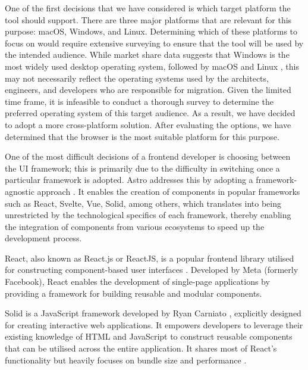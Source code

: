 One of the first decisions that we have considered is which target platform the
tool should support. There are three major platforms that are relevant for this
purpose: macOS, Windows, and Linux. Determining which of these platforms to
focus on would require extensive surveying to ensure that the tool will be used
by the intended audience. While market share data suggests that Windows is the
most widely used desktop operating system, followed by macOS and Linux
, this may not necessarily reflect the
operating systems used by the architects, engineers, and developers who are
responsible for migration. Given the limited time frame, it is infeasible to
conduct a thorough survey to determine the preferred operating system of this
target audience. As a result, we have decided to adopt a more cross-platform
solution. After evaluating the options, we have determined that the browser is
the most suitable platform for this purpose.

One of the most difficult decisions of a frontend developer is choosing between
the UI framework; this is primarily due to the difficulty in switching once a
particular framework is adopted. Astro addresses this by adopting a
framework-agnostic approach . It enables the creation of components
in popular frameworks such as React, Svelte, Vue, Solid, among others, which
translates into being unrestricted by the technological specifics of each
framework, thereby enabling the integration of components from various
ecosystems to speed up the development process.

React, also known as React.js or ReactJS, is a popular frontend library
utilised for constructing component-based user interfaces .
Developed by Meta (formerly Facebook), React enables the development of
single-page applications by providing a framework for building reusable and
modular components.

Solid is a JavaScript framework developed by Ryan Carniato ,
explicitly designed for creating interactive web applications. It empowers
developers to leverage their existing knowledge of HTML and JavaScript to
construct reusable components that can be utilised across the entire
application. It shares most of React's functionality but heavily focuses on
bundle size and performance .
